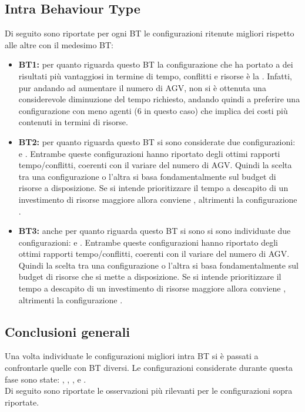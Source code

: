 \documentclass[12pt]{article}
\begin{document}
\subsection{Intra Behaviour Type}
Di seguito sono riportate per ogni BT le configurazioni ritenute migliori rispetto alle altre con il medesimo BT: 
\begin{itemize}
\item \textbf{BT1:} per quanto riguarda questo BT la configurazione che ha portato a dei risultati più vantaggiosi in termine di tempo, conflitti e risorse è la . Infatti, pur andando ad aumentare il numero di AGV, non si è ottenuta una considerevole diminuzione del tempo richiesto, andando quindi a preferire una configurazione con meno agenti (6 in questo caso) che implica dei costi più contenuti in termini di risorse.

\item \textbf{BT2:} per quanto riguarda questo BT si sono considerate due configurazioni:  e . Entrambe queste configurazioni hanno riportato degli ottimi rapporti tempo/conflitti, coerenti con il variare del numero di AGV. Quindi la scelta tra una configurazione o l'altra si basa fondamentalmente sul budget di risorse a disposizione. Se si intende prioritizzare il tempo a descapito di un investimento di risorse maggiore allora conviene , altrimenti la configurazione . 

\item \textbf{BT3:} anche per quanto riguarda questo BT si sono si sono individuate due configurazioni:  e . Entrambe queste configurazioni hanno riportato degli ottimi rapporti tempo/conflitti, coerenti con il variare del numero di AGV. Quindi la scelta tra una configurazione o l'altra si basa fondamentalmente sul budget di risorse che si mette a disposizione. Se si intende prioritizzare il tempo a descapito di un investimento di risorse maggiore allora conviene , altrimenti la configurazione . 
\end{itemize}

\subsection{Conclusioni generali}
Una volta individuate le configurazioni migliori intra BT si è passati a confrontarle quelle con BT diversi. Le configurazioni considerate durante questa fase sono state: , , ,  e .\\
Di seguito sono riportate le osservazioni più rilevanti per le configurazioni sopra riportate. \\
\end{document}
